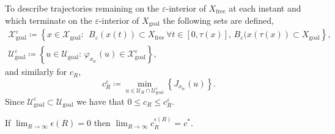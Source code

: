 \documentclass{llncs}
\begin{document}
To describe trajectories remaining on the $\varepsilon$-interior of $X_\mathrm{free}$ at each instant and which terminate on the $\varepsilon$-interior of $X_\mathrm{goal}$ the following sets are defined,
\begin{equation}
\begin{array}{l}
\mathcal{X}_\mathrm{goal}^{\varepsilon}\coloneqq\left\{ x\in\mathcal{X}_\mathrm{goal}:\,\; B_{\varepsilon}(x(t))\subset X_\mathrm{free}\, \forall t\in[0,\tau(x)], \, B_{\varepsilon}(x(\tau(x))\subset X_\mathrm{goal}\right\} ,\\
\mathcal{U}_\mathrm{goal}^{\varepsilon}\coloneqq\left\{ u\in\mathcal{U}_\mathrm{goal}:\,\varphi_{x_\mathrm{ic}}(u)\in\mathcal{X}_\mathrm{goal}^{\varepsilon}\right\} ,
\end{array}\label{eq:interiors}
\end{equation}
and similarly for $c_{R}$,
\begin{equation}
c_{R}^{\varepsilon}\coloneqq\min_{u\in\mathcal{U}_{R}\cap\mathcal{U}_\mathrm{goal}^{\varepsilon}}\left\{ J_{x_\mathrm{ic}}(u)\right\} .\label{eq:cr_ep}
\end{equation}
 Since $\ensuremath{\mathcal{U}_\mathrm{goal}^{\varepsilon}\subset\mathcal{U}_\mathrm{goal}}$
we have that $0\leq c_{R}\leq c_{R}^{\varepsilon}$. 
\begin{lemma}
\label{lem:approx_equal_optimal}If $\lim_{R\rightarrow\infty}\epsilon(R)=0$
then $\lim_{R\rightarrow\infty}c_{R}^{\epsilon(R)}=c^{*}$.\end{lemma}
\end{document}
